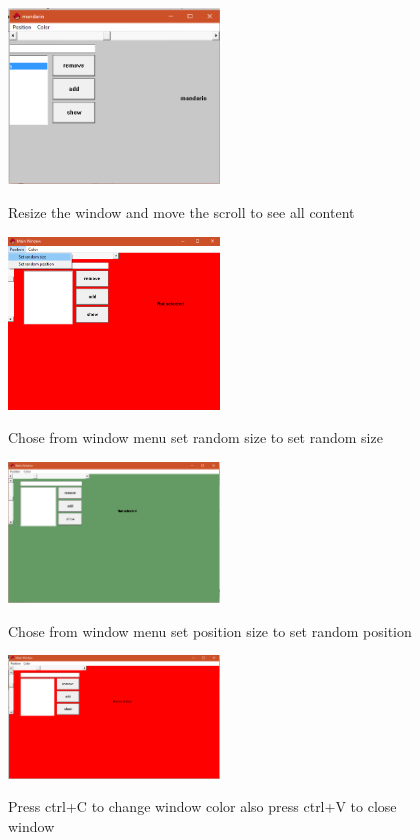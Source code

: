 \begin{figure}[h!]
  \centering
    {%
      \includegraphics[width=0.5\textwidth]{5}}
  \caption{Resize the window and move the scroll to see all content }
\end{figure}
\begin{figure}[h!]
  \centering
    {%
      \includegraphics[width=0.5\textwidth]{7}}
  \caption{Chose from window menu set random size to set random size }
\end{figure}
\begin{figure}[h!]
  \centering
    {%
      \includegraphics[width=0.5\textwidth]{8}}
  \caption{Chose from window menu set position size to set random position }
\end{figure}
\begin{figure}[h!]
  \centering
    {%
      \includegraphics[width=0.5\textwidth]{6}}
  \caption{Press ctrl+C to change window color  also press ctrl+V to close window}
\end{figure}
\clearpage